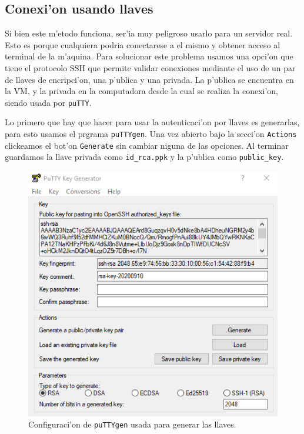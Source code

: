\documentclass[11pt]{article}
\begin{document}
	\subsection{Conexi'on usando llaves}
		Si bien este m'etodo funciona, ser'ia muy peligroso usarlo para un servidor real. Esto es porque cualquiera podria conectarese a el mismo y obtener acceso al terminal de la m'aquina. Para solucionar este problema usamos una opci'on que tiene el protocolo SSH que permite validar conexiones mediante el uso de un par de llaves de encripci'on, una p'ublica y una privada. La p'ublica se encuentra en la VM, y la privada en la computadora desde la cual se realiza la conexi'on, siendo usada por \texttt{puTTY}.
		
		Lo primero que hay que hacer para usar la autenticaci'on por llaves es generarlas, para esto usamos el prgrama \texttt{puTTYgen}. Una vez abierto bajo la secci'on \texttt{Actions} clickeamos el bot'on \texttt{Generate} sin cambiar niguna de las opciones. Al terminar guardamos la llave privada como \texttt{id\_rca.ppk} y la p'ublica como \texttt{public\_key}.	
		
		\begin{figure}[H]
    			\centering
    			\includegraphics[scale=0.9]{Images/Connection/puTTYgen.PNG}
    			\caption{Configuraci'on de \texttt{puTTYgen} usada para generar las llaves.}
    			\label{fig:puTTYgen}
		\end{figure}
		
\end{document}

